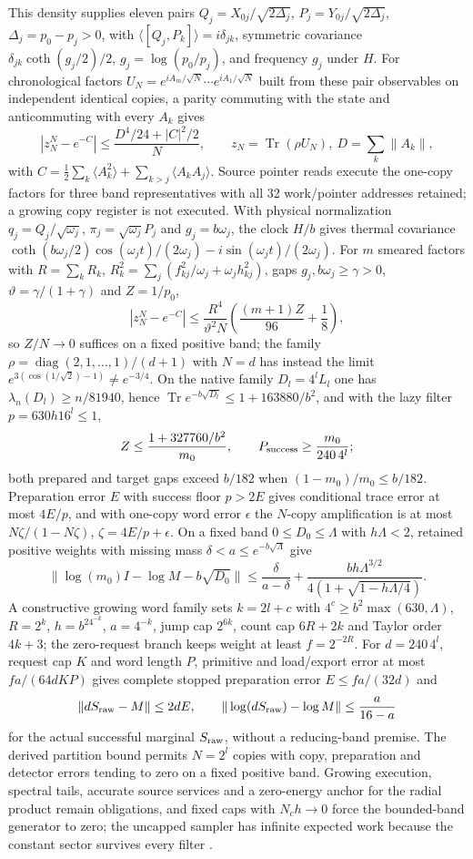 \documentclass[11pt]{article}
\theoremstyle{definition}
\theoremstyle{remark}
\theoremstyle{plain}
\newcommand{\Tr}{\operatorname{Tr}}
\newcommand{\diag}{\operatorname{diag}}
\begin{document}
This density supplies eleven pairs $Q_j=X_{0j}/\sqrt{2\Delta_j}$,
$P_j=Y_{0j}/\sqrt{2\Delta_j}$, $\Delta_j=p_0-p_j>0$, with
$\langle[Q_j,P_k]\rangle=i\delta_{jk}$, symmetric covariance
$\delta_{jk}\coth(g_j/2)/2$, $g_j=\log(p_0/p_j)$, and frequency $g_j$ under
$H$. For chronological factors $U_N=e^{iA_m/\sqrt N}\cdots e^{iA_1/\sqrt N}$
built from these pair observables on independent identical copies, a
parity commuting with the state and anticommuting with every $A_k$ gives
\[
 \left|z_N^N-e^{-C}\right|\le\frac{D^4/24+|C|^2/2}{N},\qquad
 z_N=\Tr(\rho U_N),\ D=\sum_k\|A_k\|,
\]
with $C=\tfrac12\sum_k\langle A_k^2\rangle+\sum_{k>j}\langle A_kA_j\rangle$.
Source pointer reads execute the one-copy factors for three band
representatives with all 32 work/pointer addresses retained; a growing copy
register is not executed. With physical normalization
$q_j=Q_j/\sqrt{\omega_j}$, $\pi_j=\sqrt{\omega_j}P_j$ and $g_j=b\omega_j$,
the clock $H/b$ gives thermal covariance
$\coth(b\omega_j/2)\cos(\omega_jt)/(2\omega_j)-i\sin(\omega_jt)/(2\omega_j)$.
For $m$ smeared factors with $R=\sum_kR_k$,
$R_k^2=\sum_j(f_{kj}^2/\omega_j+\omega_jh_{kj}^2)$, gaps
$g_j,b\omega_j\ge\gamma>0$, $\vartheta=\gamma/(1+\gamma)$ and $Z=1/p_0$,
\[
 |z_N^N-e^{-C}|\le
 \frac{R^4}{\vartheta^2N}\left(\frac{(m+1)Z}{96}+\frac18\right),
\]
so $Z/N\to0$ suffices on a fixed positive band; the family
$\rho=\diag(2,1,\ldots,1)/(d+1)$ with $N=d$ has instead the limit
$e^{3(\cos(1/\sqrt2)-1)}\ne e^{-3/4}$. On the native family $D_l=4^lL_l$ one
has $\lambda_n(D_l)\ge n/81940$, hence $\Tr e^{-b\sqrt{D_l}}\le1+163880/b^2$,
and with the lazy filter $p=630h16^l\le1$,
\[
 Z\le\frac{1+327760/b^2}{m_0},\qquad
 P_{\rm success}\ge\frac{m_0}{240\,4^l};
\]
both prepared and target gaps exceed $b/182$ when $(1-m_0)/m_0\le b/182$.
Preparation error $E$ with success floor $p>2E$ gives conditional trace
error at most $4E/p$, and with one-copy word error $\epsilon$ the $N$-copy
amplification is at most $N\zeta/(1-N\zeta)$, $\zeta=4E/p+\epsilon$.
On a fixed band $0\le D_0\le\Lambda$ with $h\Lambda<2$, retained positive
weights with missing mass $\delta<a\le e^{-b\sqrt\Lambda}$ give
\[
 \|\log(m_0)I-\log M-b\sqrt{D_0}\|
 \le \frac{\delta}{a-\delta}
 +\frac{bh\Lambda^{3/2}}{4(1+\sqrt{1-h\Lambda/4})}.
\]
A constructive growing word family sets $k=2l+c$ with
$4^c\ge b^2\max(630,\Lambda)$, $R=2^k$, $h=b^24^{-k}$, $a=4^{-k}$, jump cap
$2^{6k}$, count cap $6R+2k$ and Taylor order $4k+3$; the zero-request branch
keeps weight at least $f=2^{-2R}$. For $d=240\,4^l$, request cap $K$ and word
length $P$, primitive and load/export error at most $fa/(64dKP)$ gives
complete stopped preparation error $E\le fa/(32d)$ and
\[
 \|dS_{\rm raw}-M\|\le2dE,\qquad
 \|\log(dS_{\rm raw})-\log M\|\le\frac{a}{16-a}
\]
for the actual successful marginal $S_{\rm raw}$, without a reducing-band
premise. The derived partition bound permits $N=2^l$ copies with copy,
preparation and detector errors tending to zero on a fixed positive band.
Growing execution, spectral tails, accurate source services and a zero-energy
anchor for the radial product remain obligations, and fixed caps with
$N_ch\to0$ force the bounded-band generator to zero; the uncapped sampler has
infinite expected work because the constant sector survives every filter
\cite{nativePredictions}.
\end{document}
